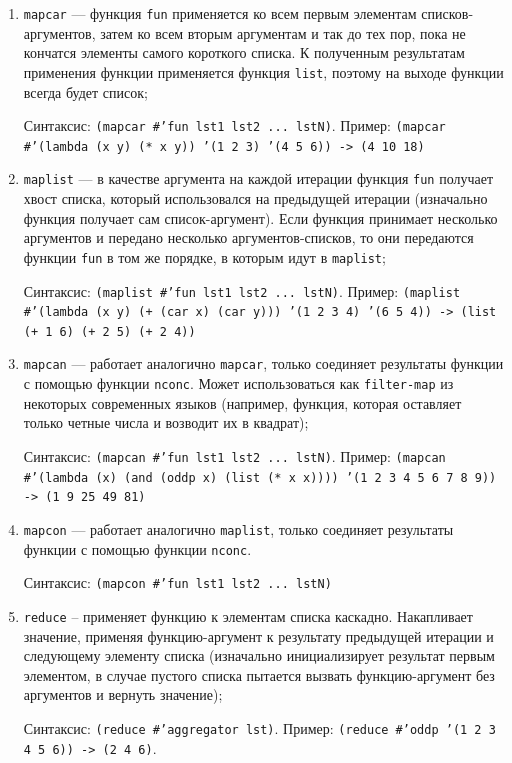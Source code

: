 \documentclass[12pt]{report}
\begin{document}
\begin{enumerate}
	\item \texttt{mapcar} --- функция \texttt{fun} применяется ко всем первым элементам списков-аргументов, затем ко всем вторым аргументам и так до тех пор, пока не кончатся элементы самого короткого списка. К полученным результатам применения функции применяется функция \texttt{list}, поэтому на выходе функции всегда будет список;
	
	Синтаксис: \texttt{(mapcar \#'fun lst1 lst2 ... lstN)}.
	Пример: \texttt{(mapcar \#'(lambda (x y) (* x y)) '(1 2 3) '(4 5 6)) -> (4 10 18)}
	
	\item \texttt{maplist} --- в качестве аргумента на каждой итерации функция \texttt{fun} получает хвост списка, который использовался на предыдущей итерации (изначально функция получает сам список-аргумент). Если функция принимает несколько аргументов и передано несколько аргументов-списков, то они передаются функции \texttt{fun} в том же порядке, в которым идут в \texttt{maplist};
	
	Синтаксис: \texttt{(maplist \#'fun lst1 lst2 ... lstN)}.
	Пример: \texttt{(maplist \#'(lambda (x y) (+ (car x) (car y))) '(1 2 3 4) '(6 5 4)) -> (list (+ 1 6) (+ 2 5) (+ 2 4))}
	
	\item \texttt{mapcan} --- работает аналогично \texttt{mapcar}, только соединяет результаты функции с помощью функции \texttt{nconc}. Может использоваться как \texttt{filter-map} из некоторых современных языков (например, функция, которая оставляет только четные числа и возводит их в квадрат);
	
	Синтаксис: \texttt{(mapcan \#'fun lst1 lst2 ... lstN)}.
	Пример: \texttt{(mapcan \#'(lambda (x) (and (oddp x) (list (* x x)))) '(1 2 3 4 5 6 7 8 9)) -> (1 9 25 49 81)}
	
	\item \texttt{mapcon} --- работает аналогично \texttt{maplist}, только соединяет результаты функции с помощью функции \texttt{nconc}.
	
	Синтаксис: \texttt{(mapcon \#'fun lst1 lst2 ... lstN)}
	
	\item \texttt{reduce} -- применяет функцию к элементам списка каскадно. Накапливает значение, применяя функцию-аргумент к результату предыдущей итерации и следующему элементу списка (изначально инициализирует результат первым элементом, в случае пустого списка пытается вызвать функцию-аргумент без аргументов и вернуть значение);
	
	Синтаксис: \texttt{(reduce \#'aggregator lst)}.
	Пример: \texttt{(reduce \#'oddp '(1 2 3 4 5 6)) -> (2 4 6)}.

\end{enumerate}

	
	
	
\end{document}
